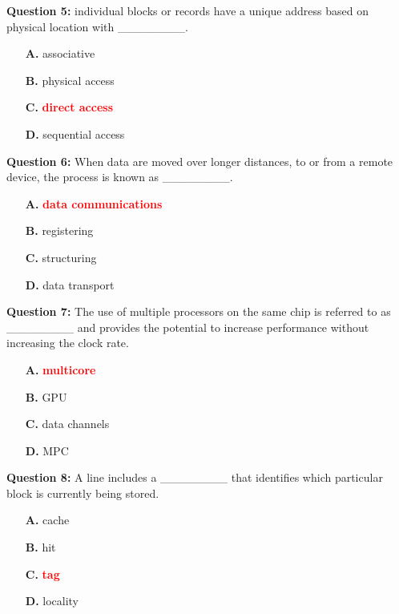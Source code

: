 \documentclass[12pt,a4paper]{article}
\begin{document}
\vspace{0.5cm}

\textbf{Question 5:} individual blocks or records have a unique address based on physical location with ________.

\begin{itemize}
    \item[\textbf{A.}] associative
    \item[\textbf{B.}] physical access
    \item[\textbf{C.}] \textcolor{red}{\textbf{direct access}}
    \item[\textbf{D.}] sequential access
\end{itemize}

\vspace{0.5cm}

\textbf{Question 6:} When data are moved over longer distances, to or from a remote device, the process is known as ________.

\begin{itemize}
    \item[\textbf{A.}] \textcolor{red}{\textbf{data communications}}
    \item[\textbf{B.}] registering
    \item[\textbf{C.}] structuring
    \item[\textbf{D.}] data transport
\end{itemize}

\vspace{0.5cm}

\textbf{Question 7:} The use of multiple processors on the same chip is referred to as ________ and provides the potential to increase performance without increasing the clock rate.

\begin{itemize}
    \item[\textbf{A.}] \textcolor{red}{\textbf{multicore}}
    \item[\textbf{B.}] GPU
    \item[\textbf{C.}] data channels
    \item[\textbf{D.}] MPC
\end{itemize}

\vspace{0.5cm}

\textbf{Question 8:} A line includes a ________ that identifies which particular block is currently being stored.

\begin{itemize}
    \item[\textbf{A.}] cache
    \item[\textbf{B.}] hit
    \item[\textbf{C.}] \textcolor{red}{\textbf{tag}}
    \item[\textbf{D.}] locality
\end{itemize}
\end{document}

